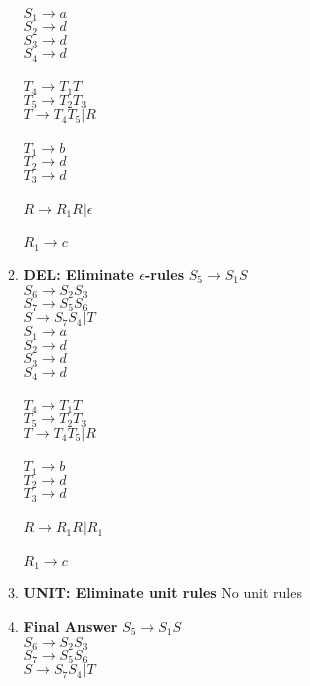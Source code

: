 \documentclass{article}
\begin{document}
\begin{enumerate}
\begin{enumerate}
				$S_1 \rightarrow a$\\
				$S_2 \rightarrow d$\\$S_3 \rightarrow d$\\$S_4 \rightarrow d$\\\\

				$T_4 \rightarrow T_1T$\\
				$T_5 \rightarrow T_2T_3$\\
				$T \rightarrow T_4T_5 | R$\\\\

				$T_1 \rightarrow b$\\ $T_2 \rightarrow d$\\$T_3 \rightarrow d$\\\\

				$R \rightarrow R_1R | \epsilon$\\\\
				$R_1 \rightarrow c$\\

			\item \textbf{DEL: Eliminate $\epsilon$-rules}
				$S_5 \rightarrow S_1S$\\
				$S_6 \rightarrow S_2S_3$\\
				$S_7 \rightarrow S_5S_6$\\
				$S \rightarrow S_7S_4 | T$\\

				$S_1 \rightarrow a$\\
				$S_2 \rightarrow d$\\$S_3 \rightarrow d$\\$S_4 \rightarrow d$\\\\

				$T_4 \rightarrow T_1T$\\
				$T_5 \rightarrow T_2T_3$\\
				$T \rightarrow T_4T_5 | R$\\\\

				$T_1 \rightarrow b$\\ $T_2 \rightarrow d$\\$T_3 \rightarrow d$\\\\

				$R \rightarrow R_1R | R_1$\\\\
				$R_1 \rightarrow c$\\
			\item \textbf{UNIT: Eliminate unit rules}
				No unit rules
			\item \textbf{Final Answer}
				$S_5 \rightarrow S_1S$\\
				$S_6 \rightarrow S_2S_3$\\
				$S_7 \rightarrow S_5S_6$\\
				$S \rightarrow S_7S_4 | T$\\


\end{enumerate}
\end{enumerate}
\end{document}

